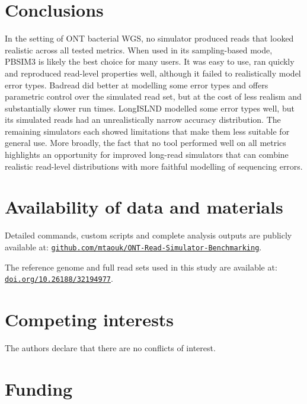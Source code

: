\documentclass[webpdf,modern,large]{biorxiv}
\begin{document}
\section{Conclusions}

In the setting of ONT bacterial WGS, no simulator produced reads that looked realistic across all tested metrics. When used in its sampling-based mode, PBSIM3 is likely the best choice for many users. It was easy to use, ran quickly and reproduced read-level properties well, although it failed to realistically model error types. Badread did better at modelling some error types and offers parametric control over the simulated read set, but at the cost of less realism and substantially slower run times. LongISLND modelled some error types well, but its simulated reads had an unrealistically narrow accuracy distribution. The remaining simulators each showed limitations that make them less suitable for general use. More broadly, the fact that no tool performed well on all metrics highlights an opportunity for improved long-read simulators that can combine realistic read-level distributions with more faithful modelling of sequencing errors.




\section{Availability of data and materials}

Detailed commands, custom scripts and complete analysis outputs are publicly available at: \href{https://github.com/mtaouk/ONT-Read-Simulator-Benchmarking}{\nolinkurl{github.com/mtaouk/ONT-Read-Simulator-Benchmarking}}.

The reference genome and full read sets used in this study are available at: \href{https://doi.org/10.26188/32194977}{\nolinkurl{doi.org/10.26188/32194977}}.



\section{Competing interests}

The authors declare that there are no conflicts of interest.




\section{Funding}
\end{document}

